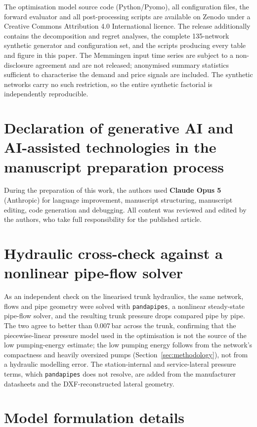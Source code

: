 \documentclass[a4paper,fleqn]{cas-sc}
\providecommand{\citep}[1]{\cite{#1}}
\begin{document}
The optimisation model source code (Python/Pyomo), all configuration files, the forward
evaluator and all post-processing scripts are available on Zenodo
\citep{ruess_2026_calion} under a Creative Commons Attribution 4.0 International licence.
The release additionally contains the decomposition and regret
analyses, the complete 135-network synthetic generator and configuration set, and the
scripts producing every table and figure in this paper. The Memmingen input time series
are subject to a non-disclosure agreement and are not released; anonymised summary
statistics sufficient to characterise the demand and price signals are included. The
synthetic networks carry no such restriction, so the entire synthetic factorial is
independently reproducible.

\section*{Declaration of generative AI and AI-assisted technologies in the manuscript
preparation process}

During the preparation of this work, the authors used \textbf{Claude Opus 5} (Anthropic)
for language improvement, manuscript structuring, manuscript editing, code generation and debugging. All content was reviewed and edited by the authors, who take full responsibility for the published article.

\appendix

\section{Hydraulic cross-check against a nonlinear pipe-flow solver}\label{app:pandapipes}
As an independent check on the linearised trunk hydraulics, the same network, flows and pipe
geometry were solved with \texttt{pandapipes}, a nonlinear steady-state pipe-flow solver, and
the resulting trunk pressure drops compared pipe by pipe. The two agree to better than
$0.007$\,bar across the trunk, confirming that the piecewise-linear pressure model used in the
optimisation is not the source of the low pumping-energy estimate; the low pumping energy
follows from the network's compactness and heavily oversized pumps (Section~\ref{sec:methodology}),
not from a hydraulic modelling error. The station-internal and service-lateral pressure terms,
which \texttt{pandapipes} does not resolve, are added from the manufacturer datasheets and the
DXF-reconstructed lateral geometry.

\section{Model formulation details}
\label{app:model_details}
\end{document}
